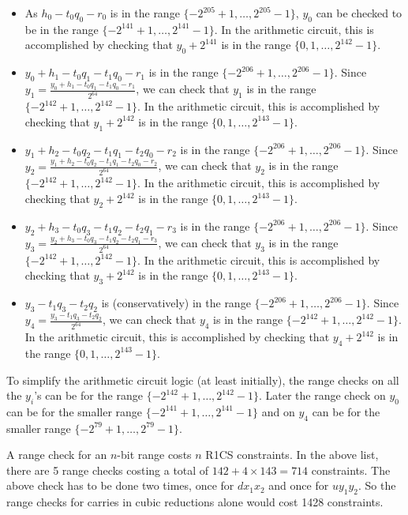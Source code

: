 \documentclass[a4paper, 12pt]{article}
\begin{document}
\begin{itemize}
  \item As $h_0 - t_0q_0-r_0$ is in the range $\{-2^{205}+1,\ldots, 2^{205}-1\}$, $y_0$ can be checked to be in the range $\{-2^{141}+1,\ldots, 2^{141}-1\}$. In the arithmetic circuit, this is accomplished by checking that $y_0 + 2^{141}$ is in the range $\{0,1,\ldots,2^{142}-1\}$.
  \item $y_0+h_1-t_0q_1-t_1q_0-r_1$ is in the range $\{-2^{206}+1,\ldots, 2^{206}-1\}$. Since $y_1 = \frac{y_0+h_1-t_0q_1-t_1q_0-r_1}{2^{64}}$, we can check that $y_1$ is in the range $\{-2^{142}+1,\ldots, 2^{142}-1\}$. In the arithmetic circuit, this is accomplished by checking that $y_1 + 2^{142}$ is in the range $\{0,1,\ldots,2^{143}-1\}$.
  \item $y_1+h_2-t_0q_2-t_1q_1-t_2q_0-r_2$ is in the range $\{-2^{206}+1,\ldots, 2^{206}-1\}$. Since $y_2 = \frac{y_1+h_2-t_0q_2-t_1q_1-t_2q_0-r_2}{2^{64}}$, we can check that $y_2$ is in the range $\{-2^{142}+1,\ldots, 2^{142}-1\}$. In the arithmetic circuit, this is accomplished by checking that $y_2 + 2^{142}$ is in the range $\{0,1,\ldots,2^{143}-1\}$.
  \item $y_2+h_3-t_0q_3-t_1q_2-t_2q_1-r_3$ is in the range $\{-2^{206}+1,\ldots, 2^{206}-1\}$. Since $y_3 = \frac{y_2+h_3-t_0q_3-t_1q_2-t_2q_1-r_3}{2^{64}}$, we can check that $y_3$ is in the range $\{-2^{142}+1,\ldots, 2^{142}-1\}$. In the arithmetic circuit, this is accomplished by checking that $y_3 + 2^{142}$ is in the range $\{0,1,\ldots,2^{143}-1\}$.
  \item $y_3-t_1q_3-t_2q_2$ is (conservatively) in the range $\{-2^{206}+1,\ldots, 2^{206}-1\}$. Since $y_4 = \frac{y_3-t_1q_3-t_2q_2}{2^{64}}$, we can check that $y_4$ is in the range $\{-2^{142}+1,\ldots, 2^{142}-1\}$. In the arithmetic circuit, this is accomplished by checking that $y_4 + 2^{142}$ is in the range $\{0,1,\ldots,2^{143}-1\}$.
\end{itemize}
To simplify the arithmetic circuit logic (at least initially), the range checks on all the $y_i$'s can be for the range $\{-2^{142}+1,\ldots, 2^{142}-1\}$. Later the range check on $y_0$ can be for the smaller range $\{-2^{141}+1,\ldots,2^{141}-1\}$ and on $y_4$ can be for the smaller range $\{-2^{79}+1,\ldots,2^{79}-1\}$.

A range check for an $n$-bit range costs $n$ R1CS constraints. In the above list, there are 5 range checks costing a total of $142 + 4 \times 143 = 714$ constraints. The above check has to be done two times, once for $dx_1x_2$ and once for $uy_1y_2$. So the range checks for carries in cubic reductions alone would cost 1428 constraints.
\end{document}
